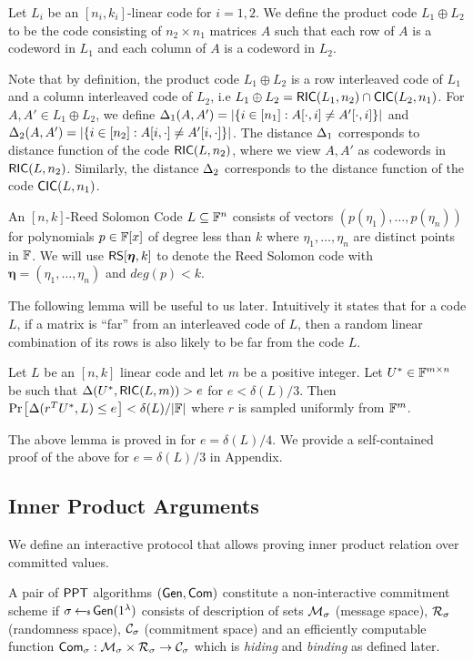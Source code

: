 \begin{definition}\label{defn:productcode}
Let $L_i$ be an $[n_i,k_i]$-linear code for $i=1,2$. We define the product code $L_1\oplus L_2$ to be the code consisting of $n_2\times n_1$ matrices $A$ such that each row of $A$ is a codeword in $L_1$ and each column of $A$ is a codeword in $L_2$. 
\end{definition}

Note that by definition, the product code $L_1\oplus L_2$ is a row interleaved code of $L_1$ and a column interleaved code of $L_2$, i.e $L_1\oplus L_2 =
\mathsf{RIC}(L_1,n_2)\cap \mathsf{CIC}(L_2,n_1)$. For $A,A'\in L_1\oplus L_2$, we define $\Delta_1(A,A')=|\{i\in [n_1]: A[\cdot,i]\neq A'[\cdot,i]\}|$ and $\Delta_2(A,A')=|\{i\in
[n_2]: A[i,\cdot]\neq A'[i,\cdot]\}|$. The distance $\Delta_1$ corresponds to distance function of the code $\mathsf{RIC}(L,n_2)$, where we view $A,A'$ as codewords in $\mathsf{RIC}(L,n_2)$. Similarly, the distance $\Delta_2$ corresponds to the distance function of the code $\mathsf{CIC}(L,n_1)$.

\begin{definition}\label{defn:rscode}
An $[n,k]$-Reed Solomon Code $L\subseteq \mathbb{F}^n$ consists of vectors $(p(\eta_1),\ldots,p(\eta_n))$ for polynomials $p\in \mathbb{F}[x]$ of degree less than $k$ where $\eta_1,\ldots,\eta_n$ are distinct points in $\mathbb{F}$. We will use $\mathsf{RS}[\bm{\eta},k]$ to denote the Reed Solomon code with $\bm{\eta}=(\eta_1,\ldots,\eta_n)$ and $deg(p)<k$.
\end{definition}
   
The following lemma will be useful to us later. Intuitively it states that for a code $L$, if a matrix is ``far'' from an interleaved code of $L$, then a random linear combination of its rows is also likely to be far from the code $L$. 

\begin{lemma}\label{lem:proximitytest}
Let $L$ be an $[n,k]$ linear code and let $m$ be a positive integer. Let $U^*\in \mathbb{F}^{m\times n}$ be such that $\Delta(U^\ast,\mathsf{RIC}(L,m))>e$ for $e<\delta(L)/3$. Then $\prob{\dham(r^TU^*,L)\leq e}<\delta(L)/|\bbF|$ where $r$ is sampled uniformly from $\mathbb{F}^m$.
\end{lemma}
The above lemma is proved in \cite{Ligero2017} for $e=\delta(L)/4$. We provide a self-contained proof of the above for $e=\delta(L)/3$ in Appendix.


\subsection{Inner Product Arguments}
We define an interactive protocol that allows proving inner product relation over committed values. 
\begin{definition}\label{defn:commscheme}
 A pair of $\mathsf{PPT}$ algorithms $(\mathsf{Gen},\mathsf{Com})$ constitute a non-interactive commitment scheme if $\sigma\hskip2.3pt{\gets\!\!\mbox{\tiny${\$}$\normalsize}}\, \mathsf{Gen}(1^{\lambda})$ consists of description of sets $\mathcal{M}_\sigma$ (message space), $\mathcal{R}_\sigma$ (randomness space), $\mathcal{C}_\sigma$ (commitment space) and an efficiently computable function $\mathsf{Com}_\sigma: \mathcal{M}_\sigma\times \mathcal{R}_\sigma\rightarrow \mathcal{C}_\sigma$ which is {\em hiding} and {\em binding} as defined later.
\end{definition}

